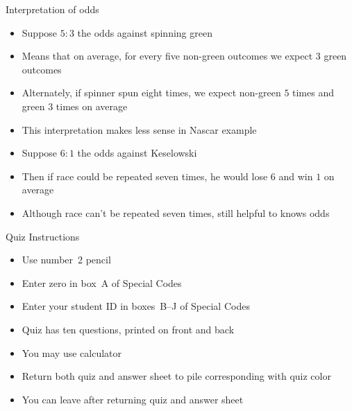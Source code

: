 \documentclass{beamer}
\theoremstyle{definition}
\begin{document}
\begin{frame}{Interpretation of odds} 
\begin{itemize}
\item Suppose $5:3$ the odds against spinning green
\item Means that on average, for every five non-green outcomes
we expect $3$ green outcomes
\item Alternately, if spinner spun eight times, we expect
non-green $5$ times and green $3$ times on average
\item This interpretation makes less sense in Nascar example
\item Suppose $6:1$ the odds against Keselowski
\item Then if race could be repeated seven times, he would
lose $6$ and win $1$ on average
\item Although race can't be repeated seven times,
still helpful to knows odds
\end{itemize}
\end{frame}

\begin{frame}{Quiz Instructions}
\begin{itemize}
\item Use number~2 pencil
\item Enter zero in box~A of Special Codes
\item Enter your student ID in boxes~B--J of Special Codes
\item Quiz has ten questions, printed on front and back
\item You \alert{may} use calculator
\item Return both quiz and answer sheet to pile
corresponding with quiz color
\item You can leave after returning quiz and answer sheet
\end{itemize}
\end{frame}
\end{document}
